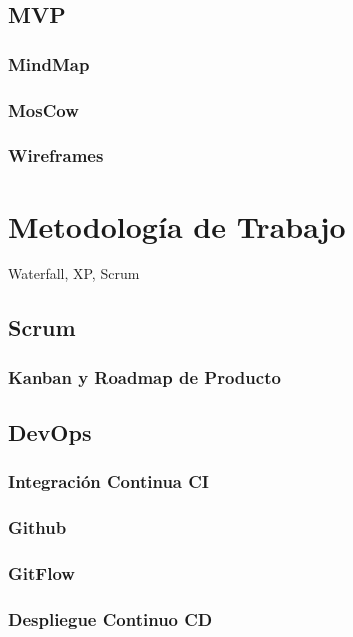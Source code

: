 \documentclass[12pt,twoside,titlepage]{report}
\begin{document}
\subsection{MVP}
\subsubsection{MindMap}

\subsubsection{MosCow}

\subsubsection{Wireframes}

\section{Metodología de Trabajo}

Waterfall, XP, Scrum

\subsection{Scrum}

\subsubsection{Kanban y Roadmap de Producto}

\subsection{DevOps}
\subsubsection{Integración Continua CI}
\subsubsection{Github}
\subsubsection{GitFlow}

\subsubsection{Despliegue Continuo CD}
\end{document}
